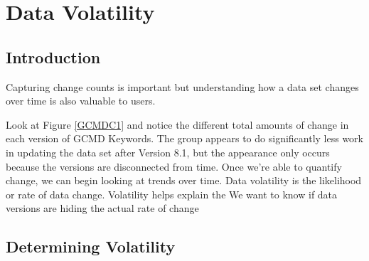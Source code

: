 
\chapter{Data Volatility}

\section{Introduction}

Capturing change counts is important but understanding how a data set changes over time is also valuable to users.

Look at Figure \ref{GCMDC1} and notice the different total amounts of change in each version of GCMD Keywords.
The group appears to do significantly less work in updating the data set after Version 8.1, but the appearance only occurs because the versions are disconnected from time.
Once we're able to quantify change, we can begin looking at trends over time.
Data volatility is the likelihood or rate of data change.
Volatility helps explain the 
We want to know if data versions are hiding the actual rate of change

\section{Determining Volatility}

